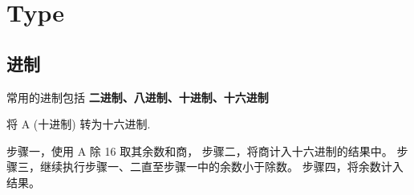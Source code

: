 \section{Type}
\subsection{进制}
常用的进制包括 \textbf{二进制、八进制、十进制、十六进制}

\begin{example}
	将 A (十进制) 转为十六进制.

	步骤一，使用 A 除 16 取其余数和商，
	步骤二，将商计入十六进制的结果中。
	步骤三，继续执行步骤一、二直至步骤一中的余数小于除数。
	步骤四，将余数计入结果。

\end{example}


